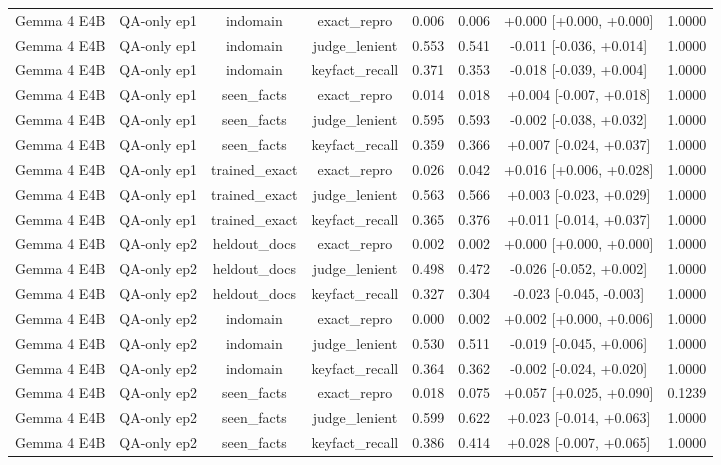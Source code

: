\begin{table}[t]
{\begin{tabular}{llcccccc}
Gemma 4 E4B & QA-only ep1 & indomain & exact\_repro & 0.006 & 0.006 & +0.000 [+0.000, +0.000] & 1.0000 \\
Gemma 4 E4B & QA-only ep1 & indomain & judge\_lenient & 0.553 & 0.541 & -0.011 [-0.036, +0.014] & 1.0000 \\
Gemma 4 E4B & QA-only ep1 & indomain & keyfact\_recall & 0.371 & 0.353 & -0.018 [-0.039, +0.004] & 1.0000 \\
Gemma 4 E4B & QA-only ep1 & seen\_facts & exact\_repro & 0.014 & 0.018 & +0.004 [-0.007, +0.018] & 1.0000 \\
Gemma 4 E4B & QA-only ep1 & seen\_facts & judge\_lenient & 0.595 & 0.593 & -0.002 [-0.038, +0.032] & 1.0000 \\
Gemma 4 E4B & QA-only ep1 & seen\_facts & keyfact\_recall & 0.359 & 0.366 & +0.007 [-0.024, +0.037] & 1.0000 \\
Gemma 4 E4B & QA-only ep1 & trained\_exact & exact\_repro & 0.026 & 0.042 & +0.016 [+0.006, +0.028] & 1.0000 \\
Gemma 4 E4B & QA-only ep1 & trained\_exact & judge\_lenient & 0.563 & 0.566 & +0.003 [-0.023, +0.029] & 1.0000 \\
Gemma 4 E4B & QA-only ep1 & trained\_exact & keyfact\_recall & 0.365 & 0.376 & +0.011 [-0.014, +0.037] & 1.0000 \\
Gemma 4 E4B & QA-only ep2 & heldout\_docs & exact\_repro & 0.002 & 0.002 & +0.000 [+0.000, +0.000] & 1.0000 \\
Gemma 4 E4B & QA-only ep2 & heldout\_docs & judge\_lenient & 0.498 & 0.472 & -0.026 [-0.052, +0.002] & 1.0000 \\
Gemma 4 E4B & QA-only ep2 & heldout\_docs & keyfact\_recall & 0.327 & 0.304 & -0.023 [-0.045, -0.003] & 1.0000 \\
Gemma 4 E4B & QA-only ep2 & indomain & exact\_repro & 0.000 & 0.002 & +0.002 [+0.000, +0.006] & 1.0000 \\
Gemma 4 E4B & QA-only ep2 & indomain & judge\_lenient & 0.530 & 0.511 & -0.019 [-0.045, +0.006] & 1.0000 \\
Gemma 4 E4B & QA-only ep2 & indomain & keyfact\_recall & 0.364 & 0.362 & -0.002 [-0.024, +0.020] & 1.0000 \\
Gemma 4 E4B & QA-only ep2 & seen\_facts & exact\_repro & 0.018 & 0.075 & +0.057 [+0.025, +0.090] & 0.1239 \\
Gemma 4 E4B & QA-only ep2 & seen\_facts & judge\_lenient & 0.599 & 0.622 & +0.023 [-0.014, +0.063] & 1.0000 \\
Gemma 4 E4B & QA-only ep2 & seen\_facts & keyfact\_recall & 0.386 & 0.414 & +0.028 [-0.007, +0.065] & 1.0000 \\

\end{tabular}}
\end{table}
